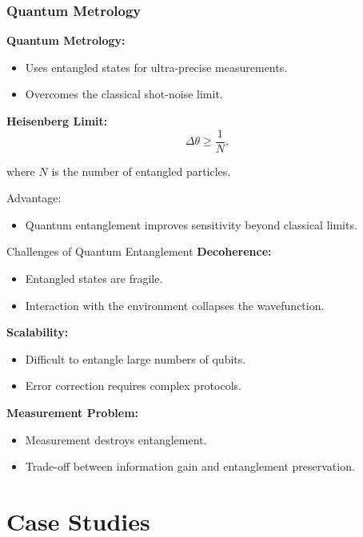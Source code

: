 \documentclass[aspectratio=169]{beamer}
\begin{document}
\begin{frame}
\frametitle{Quantum Metrology}

\textbf{Quantum Metrology:}
\begin{itemize}
    \item Uses entangled states for ultra-precise measurements.
    \item Overcomes the classical shot-noise limit.
\end{itemize}

\textbf{Heisenberg Limit:}
\[
\Delta \theta \ge \frac{1}{N},
\]

where \( N \) is the number of entangled particles.  

\begin{block}{Advantage:}
\begin{itemize}
\item Quantum entanglement improves sensitivity beyond classical limits.
\end{itemize}
\end{block}
\end{frame}

\begin{frame}{Challenges of Quantum Entanglement}
\textbf{Decoherence:}
\begin{itemize}
    \item Entangled states are fragile.
    \item Interaction with the environment collapses the wavefunction.
\end{itemize}

\textbf{Scalability:}
\begin{itemize}
    \item Difficult to entangle large numbers of qubits.
    \item Error correction requires complex protocols.
\end{itemize}

\textbf{Measurement Problem:}
\begin{itemize}
    \item Measurement destroys entanglement.
    \item Trade-off between information gain and entanglement preservation.
\end{itemize}
\end{frame}


\section{Case Studies}
\end{document}
